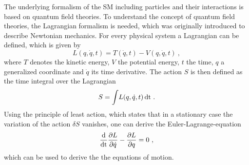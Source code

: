 \noindent The underlying formalism of the SM including particles and their interactions is based on quantum field theories. To understand the concept of quantum field theories, the Lagrangian formalism is needed, which was originally introduced to describe Newtonian mechanics. For every physical system a Lagrangian can be defined, which is given by
\begin{equation}
L(q,\dot{q},t) = T(\dot{q},t) - V(q,\dot{q},t) ~,
\end{equation}
where $T$ denotes the kinetic energy, $V$ the potential energy, $t$ the time, $q$ a generalized coordinate and $\dot{q}$ its time derivative. The action $S$ is then defined as the time integral over the Lagrangian
\begin{equation}
S = \int \! L(q,\dot{q},t) \, \rm{dt} ~.
\end{equation}
Using the principle of least action, which states that in a stationary case the variation of the action $\delta S$ vanishes, one can derive the Euler-Lagrange-equation
\begin{equation}
\frac{\rm{d}}{\rm{dt}}\frac{\partial L}{\partial \dot{q}} - \frac{\partial L}{\partial q} = 0 ~,
\end{equation}
which can be used to derive the the equations of motion.\\

